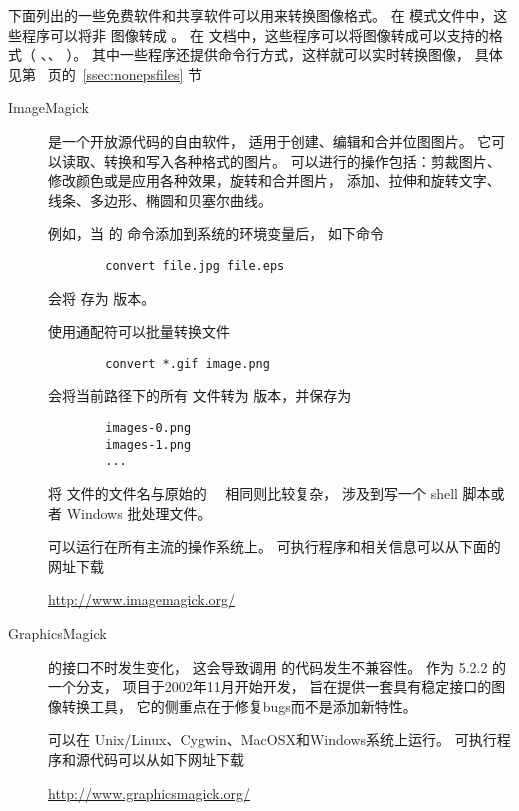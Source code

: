 下面列出的一些免费软件和共享软件可以用来转换图像格式。
在  模式文件中，这些程序可以将非 图像转成 。
在 \pdfLaTeX{} 文档中，这些程序可以将图像转成可以支持的格式（ 、、 ）。
其中一些程序还提供命令行方式，这样就可以实时转换图像，
具体见第~\pageref{ssec:nonepsfile} 页的~\ref{ssec:nonepsfiles} 节

\begin{description}
	\item[ImageMagick] 
	
	 是一个开放源代码的自由软件，
	适用于创建、编辑和合并位图图片。
	它可以读取、转换和写入各种格式的图片。
	可以进行的操作包括：剪裁图片、修改颜色或是应用各种效果，旋转和合并图片，
	添加、拉伸和旋转文字、线条、多边形、椭圆和贝塞尔曲线。
	
	例如，当  的  命令添加到系统的环境变量后，
	如下命令
\begin{verbatim}
		convert file.jpg file.eps
\end{verbatim}
	会将  存为  版本。
	
	使用通配符可以批量转换文件
\begin{verbatim}
		convert *.gif image.png
\end{verbatim}
	会将当前路径下的所有  文件转为  版本，并保存为
\begin{verbatim}
		images-0.png
		images-1.png
		...
\end{verbatim}
	将 文件的文件名与原始的　 相同则比较复杂，
	涉及到写一个 shell 脚本或者 Windows 批处理文件。
	
	 可以运行在所有主流的操作系统上。
	可执行程序和相关信息可以从下面的网址下载
	\begin{center}
		\url{http://www.imagemagick.org/}
	\end{center}
	
	\item[GraphicsMagick]
	 的接口不时发生变化，
	这会导致调用  的代码发生不兼容性。
	作为  5.2.2 的一个分支，
	 项目于2002年11月开始开发，
	旨在提供一套具有稳定接口的图像转换工具，
	它的侧重点在于修复bugs而不是添加新特性。
	
	 可以在 Unix/Linux、Cygwin、MacOSX和Windows系统上运行。
	可执行程序和源代码可以从如下网址下载
	\begin{center}
		\url{http://www.graphicsmagick.org/}
	\end{center}
	

\end{description}
